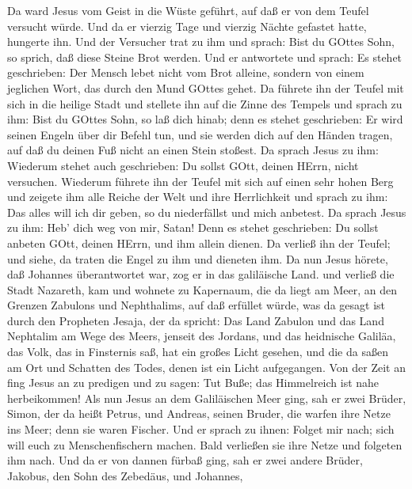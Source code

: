  Da ward Jesus vom Geist in die Wüste geführt, auf daß er
von dem Teufel versucht würde.  Und da er vierzig Tage und
vierzig Nächte gefastet hatte, hungerte ihn.  Und der
Versucher trat zu ihm und sprach: Bist du GOttes Sohn, so sprich, daß
diese Steine Brot werden.  Und er antwortete und sprach: Es
stehet geschrieben: Der Mensch lebet nicht vom Brot alleine, sondern von
einem jeglichen Wort, das durch den Mund GOttes gehet.  Da
führete ihn der Teufel mit sich in die heilige Stadt und stellete ihn
auf die Zinne des Tempels  und sprach zu ihm: Bist du GOttes
Sohn, so laß dich hinab; denn es stehet geschrieben: Er wird seinen
Engeln über dir Befehl tun, und sie werden dich auf den Händen tragen,
auf daß du deinen Fuß nicht an einen Stein stoßest.  Da
sprach Jesus zu ihm: Wiederum stehet auch geschrieben: Du sollst GOtt,
deinen HErrn, nicht versuchen.  Wiederum führete ihn der
Teufel mit sich auf einen sehr hohen Berg und zeigete ihm alle Reiche
der Welt und ihre Herrlichkeit  und sprach zu ihm: Das alles
will ich dir geben, so du niederfällst und mich anbetest. 
Da sprach Jesus zu ihm: Heb' dich weg von mir, Satan! Denn es stehet
geschrieben: Du sollst anbeten GOtt, deinen HErrn, und ihm allein
dienen.  Da verließ ihn der Teufel; und siehe, da traten
die Engel zu ihm und dieneten ihm.  Da nun Jesus hörete,
daß Johannes überantwortet war, zog er in das galiläische Land.
 und verließ die Stadt Nazareth, kam und wohnete zu
Kapernaum, die da liegt am Meer, an den Grenzen Zabulons und
Nephthalims,  auf daß erfüllet würde, was da gesagt ist
durch den Propheten Jesaja, der da spricht:  Das Land
Zabulon und das Land Nephtalim am Wege des Meers, jenseit des Jordans,
und das heidnische Galiläa,  das Volk, das in Finsternis
saß, hat ein großes Licht gesehen, und die da saßen am Ort und Schatten
des Todes, denen ist ein Licht aufgegangen.  Von der Zeit
an fing Jesus an zu predigen und zu sagen: Tut Buße; das Himmelreich ist
nahe herbeikommen!  Als nun Jesus an dem Galiläischen Meer
ging, sah er zwei Brüder, Simon, der da heißt Petrus, und Andreas,
seinen Bruder, die warfen ihre Netze ins Meer; denn sie waren Fischer.
 Und er sprach zu ihnen: Folget mir nach; sich will euch zu
Menschenfischern machen.  Bald verließen sie ihre Netze und
folgeten ihm nach.  Und da er von dannen fürbaß ging, sah
er zwei andere Brüder, Jakobus, den Sohn des Zebedäus, und Johannes,
